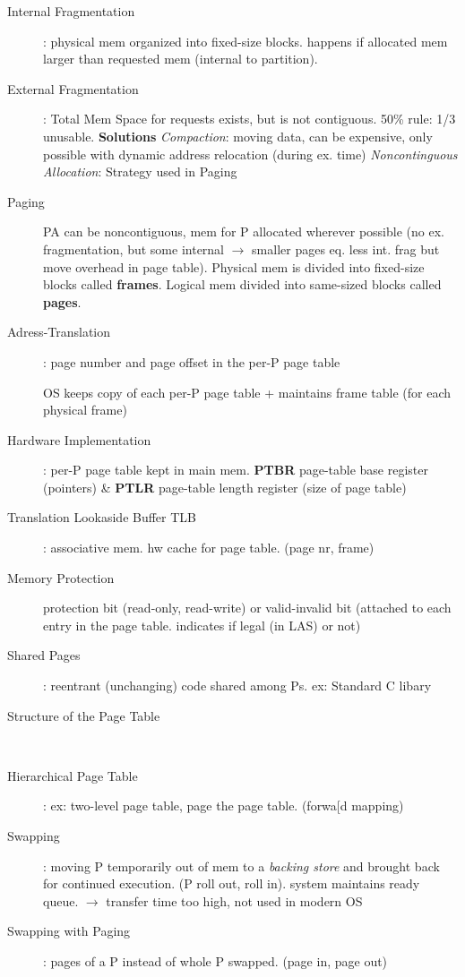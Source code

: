 \begin{description}
    \item[Internal Fragmentation]: physical mem organized into fixed-size blocks. happens if allocated mem larger than requested mem (internal to partition). \\
    \item[External Fragmentation]: Total Mem Space for requests exists, but is not contiguous. 50\% rule: 1/3 unusable. \textbf{Solutions} \textit{Compaction}: moving data, can be expensive, only possible with dynamic address relocation (during ex. time) \textit{Noncontinguous Allocation}: Strategy used in Paging \\
    \item[Paging] PA can be noncontiguous, mem for P allocated wherever possible (no ex. fragmentation, but some internal $\rightarrow$ smaller pages eq. less int. frag but move overhead in page table). Physical mem is divided into fixed-size blocks called \textbf{frames}. Logical mem divided into same-sized blocks called \textbf{pages}.\\
    \item[Adress-Translation]: page number and page offset in the per-P page table
    \item[] OS keeps copy of each per-P page table + maintains frame table (for each physical frame)
    \item[Hardware Implementation]: per-P page table kept in main mem. \textbf{PTBR} page-table base register (pointers) \& \textbf{PTLR} page-table length register (size of page table)
    \item[Translation Lookaside Buffer TLB]: associative mem. hw cache for page table. (page nr, frame)
    \item[Memory Protection] protection bit (read-only, read-write) or valid-invalid bit (attached to each entry in the page table. indicates if legal (in LAS) or not)
    \item[Shared Pages]: reentrant (unchanging) code shared among Ps. ex: Standard C libary
    \item[Structure of the Page Table] \\
    \item[Hierarchical Page Table]: ex: two-level page table, page the page table. (forwa[d mapping) \\
    \item[Swapping]: moving P temporarily out of mem to a \textit{backing store} and brought back for continued execution. (P roll out, roll in). system maintains ready queue. $\rightarrow$ transfer time too high, not used in modern OS  \\
    \item[Swapping with Paging]: pages of a P instead of whole P swapped. (page in, page out)
\end{description}
